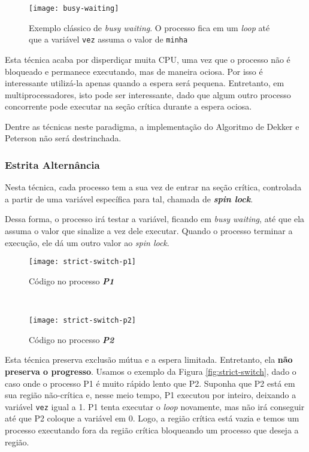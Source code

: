 \begin{figure}[ht]
  \centering
  \texttt{[image: busy-waiting]}
  \caption{Exemplo clássico de \textit{busy waiting}. O processo fica em um \textit{loop} até que a variável \texttt{vez} assuma o valor de \texttt{minha}}
  \label{fig:busy-waiting}
\end{figure}

Esta técnica acaba por disperdiçar muita CPU, uma vez que o processo não é bloqueado e permanece executando, mas de maneira ociosa. Por isso é interessante utilizá-la apenas quando a espera será pequena. Entretanto, em multiprocessadores, isto pode ser interessante, dado que algum outro processo concorrente pode executar na seção crítica durante a espera ociosa.

Dentre as técnicas neste paradigma, a implementação do Algoritmo de Dekker e Peterson não será destrinchada.






\subsubsection{Estrita Alternância}
Nesta técnica, cada processo tem a sua vez de entrar na seção crítica, controlada a partir de uma variável específica para tal, chamada de \textbf{\textit{spin lock}}.

Dessa forma, o processo irá testar a variável, ficando em \textit{busy waiting}, até que ela assuma o valor que sinalize a vez dele executar. Quando o processo terminar a execução, ele dá um outro valor ao \textit{spin lock}.

\begin{figure*}[ht]
  \begin{subfigure}{0.5\textwidth}
    \centering
    \texttt{[image: strict-switch-p1]}
    \caption{Código no processo \textbf{\textit{P1}}}
  \end{subfigure}
  ~
  \begin{subfigure}{0.5\textwidth}
    \centering
    \texttt{[image: strict-switch-p2]}
    \caption{Código no processo \textbf{\textit{P2}}}
  \end{subfigure}

  \caption{Exemplo clássico de estrita alternância}
  \label{fig:strict-switch}
\end{figure*}

Esta técnica preserva exclusão mútua e a espera limitada. Entretanto, ela \textbf{não preserva o progresso}. Usamos o exemplo da Figura \ref{fig:strict-switch}, dado o caso onde o processo P1 é muito rápido lento que P2. Suponha que P2 está em sua região não-crítica e, nesse meio tempo, P1 executou por inteiro, deixando a variável \texttt{vez} igual a 1. P1 tenta executar o \textit{loop} novamente, mas não irá conseguir até que P2 coloque a variável em 0. Logo, a região crítica está vazia e temos um processo executando fora da região crítica bloqueando um processo que deseja a região.








